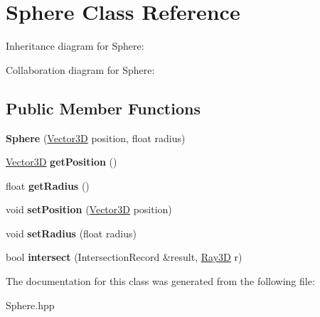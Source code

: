 \hypertarget{classSphere}{}\section{Sphere Class Reference}
\label{classSphere}


Inheritance diagram for Sphere\+:


Collaboration diagram for Sphere\+:
\subsection*{Public Member Functions}
\begin{DoxyCompactItemize}
\item 
\mbox{\label{classSphere_a70ae4c2423a0c7ef927f73780f938a2f}} 
{\bfseries Sphere} (\hyperlink{classVector3D}{Vector3D} position, float radius)
\item 
\mbox{\label{classSphere_a49e471cdf1995596de2e0b3575846e6c}} 
\hyperlink{classVector3D}{Vector3D} {\bfseries get\+Position} ()
\item 
\mbox{\label{classSphere_a330dd34c7c7b6dfff106c4c71ec80028}} 
float {\bfseries get\+Radius} ()
\item 
\mbox{\label{classSphere_a727c28db575e924afd47dea0bbcb367e}} 
void {\bfseries set\+Position} (\hyperlink{classVector3D}{Vector3D} position)
\item 
\mbox{\label{classSphere_a9a563adc1ae20e8b1866caf8f2fb0285}} 
void {\bfseries set\+Radius} (float radius)
\item 
\mbox{\label{classSphere_a2172576ac6febf9ba5b40c7fd1e2101e}} 
bool {\bfseries intersect} (Intersection\+Record \&result, \hyperlink{classRay3D}{Ray3D} r)
\end{DoxyCompactItemize}


The documentation for this class was generated from the following file\+:\begin{DoxyCompactItemize}
\item 
Sphere.\+hpp\end{DoxyCompactItemize}
